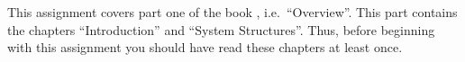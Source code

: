 This assignment covers part one of the book 
\cite{Silberschatz2013intl,Silberschatz2013osc}, i.e.\  ``Overview''.
This part contains the chapters ``Introduction'' and ``System Structures''.
Thus, before beginning with this assignment you should have read these chapters 
at least once.
